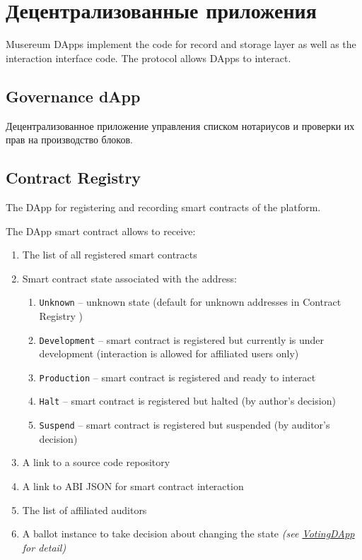 \documentclass[12pt]{report}
\newcommand{\hlc}[1]{\colorbox{yellow!25}{#1}}
\def\code#1{\colorbox{light-gray}{\texttt{#1}}}
\begin{document}
\section{Децентрализованные приложения}
\label{tech-apps}
Musereum DApps implement the code for record and storage layer as well as the interaction interface code. The protocol allows DApps to interact.

\subsection{Governance dApp}
\label{tech-apps-governance}
\begin{multicols}{2}
Децентрализованное приложение управления списком нотариусов и проверки их прав на производство блоков.
\end{multicols}

\subsection{Contract Registry}
\label{tech-apps-contracts-registry}
\begin{multicols}{2}
The DApp for registering and recording smart contracts of the platform.

The DApp smart contract allows to receive:
\begin{enumerate}
	\item The list of all registered smart contracts
	\item Smart contract state associated with the address:
	\begin{enumerate}
		\item \code{Unknown} – unknown state (default for unknown addresses in \hlc{Contract Registry })
		\item \code{Development} – smart contract is registered but currently is under development (interaction is allowed for affiliated users only)
		\item \code{Production} – smart contract is registered and \hlc{ready to interact}
		\item \code{Halt} – smart contract is registered but halted (by author's decision)
		\item \code{Suspend} – smart contract is registered but suspended (by auditor's decision)
	\end{enumerate}
\item A link to a source code repository
\item A link to ABI JSON for smart contract interaction
\item The list of affiliated auditors
\item A ballot \hlc{instance} to take decision about changing the state \textit{(see \hyperref[tech-apps-voting]{VotingDApp} for detail)}
\end{enumerate}
\end{multicols}
\end{document}
